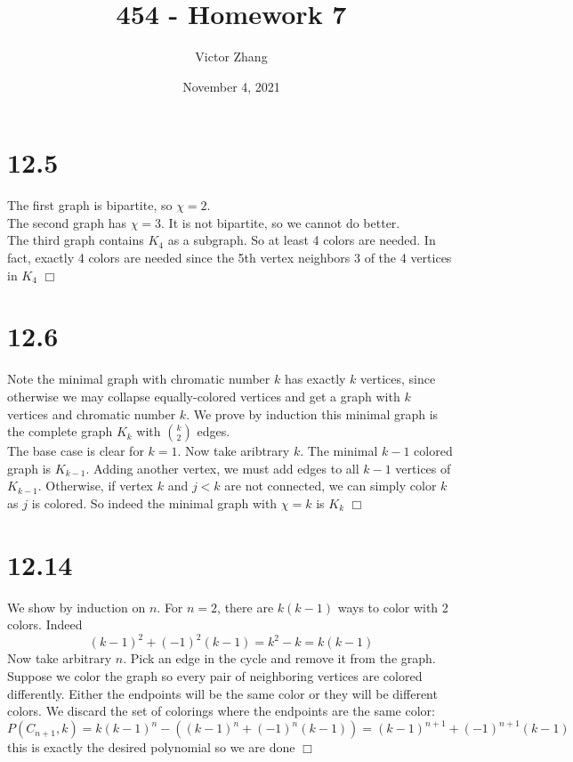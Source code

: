 \documentclass{article}
\title{454 - Homework 7}
\author{Victor Zhang}
\date{November 4, 2021}
\begin{document}
\maketitle

\section*{12.5}
The first graph is bipartite, so $\chi = 2$.\\
The second graph has $\chi = 3$. It is not bipartite, so we cannot do better.\\
The third graph contains $K_4$ as a subgraph. So at least 4 colors are needed. In fact, exactly 4 colors are needed since the 5th vertex neighbors 3 of the 4 vertices in $K_4$ $\Box$

\section*{12.6}
Note the minimal graph with chromatic number $k$ has exactly $k$ vertices, since otherwise we may collapse equally-colored vertices and get a graph with $k$ vertices and chromatic number $k$. We prove by induction this minimal graph is the complete graph $K_k$ with $\binom{k}{2}$ edges.\\
The base case is clear for $k = 1$. Now take aribtrary $k$. The minimal $k-1$ colored graph is $K_{k-1}$. Adding another vertex, we must add edges to all $k-1$ vertices of $K_{k-1}$. Otherwise, if vertex $k$ and $j < k$ are not connected, we can simply color $k$ as $j$ is colored. So indeed the minimal graph with $\chi = k$ is $K_k$ $\Box$

\section*{12.14}
We show by induction on $n$. For $n = 2$, there are $k(k-1)$ ways to color with 2 colors. Indeed
$$(k-1)^2 + (-1)^2(k-1) = k^2 - k = k(k-1)$$
Now take arbitrary $n$. Pick an edge in the cycle and remove it from the graph. Suppose we color the graph so every pair of neighboring vertices are colored differently. Either the endpoints will be the same color or they will be different colors. We discard the set of colorings where the endpoints are the same color:
$$P(C_{n+1}, k) = k(k-1)^n - ((k-1)^n + (-1)^{n}(k-1)) = (k-1)^{n+1} + (-1)^{n+1}(k-1)$$
this is exactly the desired polynomial so we are done $\Box$
\end{document}
